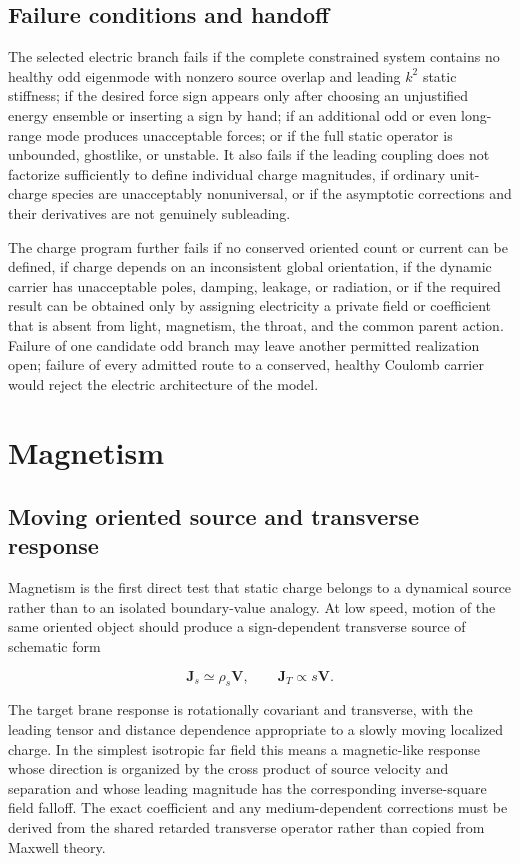 \subsection{Failure conditions and handoff}

The selected electric branch fails if the complete constrained system contains
no healthy odd eigenmode with nonzero source overlap and leading \(k^2\) static
stiffness; if the desired force sign appears only after choosing an unjustified
energy ensemble or inserting a sign by hand; if an additional odd or even
long-range mode produces unacceptable forces; or if the full static operator is
unbounded, ghostlike, or unstable. It also fails if the leading coupling does
not factorize sufficiently to define individual charge magnitudes, if ordinary
unit-charge species are unacceptably nonuniversal, or if the asymptotic
corrections and their derivatives are not genuinely subleading.

The charge program further fails if no conserved oriented count or current can
be defined, if charge depends on an inconsistent global orientation, if the
dynamic carrier has unacceptable poles, damping, leakage, or radiation, or if
the required result can be obtained only by assigning electricity a private
field or coefficient that is absent from light, magnetism, the throat, and the
common parent action. Failure of one candidate odd branch may leave another
permitted realization open; failure of every admitted route to a conserved,
healthy Coulomb carrier would reject the electric architecture of the model.

\section{Magnetism}

\subsection{Moving oriented source and transverse response}

Magnetism is the first direct test that static charge belongs to a dynamical
source rather than to an isolated boundary-value analogy. At low speed, motion
of the same oriented object should produce a sign-dependent transverse source
of schematic form

\[
\mathbf J_s\simeq \rho_s\mathbf V,
\qquad
\mathbf J_T\propto s\mathbf V.
\]

The target brane response is rotationally covariant and transverse, with the
leading tensor and distance dependence appropriate to a slowly moving localized
charge. In the simplest isotropic far field this means a magnetic-like response
whose direction is organized by the cross product of source velocity and
separation and whose leading magnitude has the corresponding inverse-square
field falloff. The exact coefficient and any medium-dependent corrections must
be derived from the shared retarded transverse operator rather than copied from
Maxwell theory.

